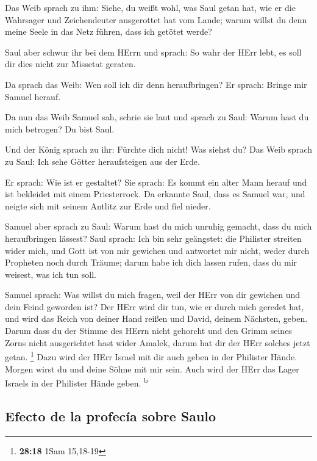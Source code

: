  Das Weib sprach zu ihm: Siehe, du weißt wohl, was Saul
getan hat, wie er die Wahrsager und Zeichendeuter ausgerottet hat vom
Lande; warum willst du denn meine Seele in das Netz führen, dass ich
getötet werde?

 Saul aber schwur ihr bei dem HErrn und sprach: So wahr
der HErr lebt, es soll dir dies nicht zur Missetat geraten.

 Da sprach das Weib: Wen soll ich dir denn heraufbringen?
Er sprach: Bringe mir Samuel herauf.

 Da nun das Weib Samuel sah, schrie sie laut und sprach
zu Saul: Warum hast du mich betrogen? Du bist Saul.

 Und der König sprach zu ihr: Fürchte dich nicht! Was
siehst du? Das Weib sprach zu Saul: Ich sehe Götter heraufsteigen aus
der Erde.

 Er sprach: Wie ist er gestaltet? Sie sprach: Es kommt
ein alter Mann herauf und ist bekleidet mit einem Priesterrock. Da
erkannte Saul, dass es Samuel war, und neigte sich mit seinem Antlitz
zur Erde und fiel nieder.

 Samuel aber sprach zu Saul: Warum hast du mich unruhig
gemacht, dass du mich heraufbringen lässest? Saul sprach: Ich bin sehr
geängstet: die Philister streiten wider mich, und Gott ist von mir
gewichen und antwortet mir nicht, weder durch Propheten noch durch
Träume; darum habe ich dich lassen rufen, dass du mir weisest, was ich
tun soll.

 Samuel sprach: Was willst du mich fragen, weil der HErr
von dir gewichen und dein Feind geworden ist?  Der HErr
wird dir tun, wie er durch mich geredet hat, und wird das Reich von
deiner Hand reißen und David, deinem Nächsten, geben. 
Darum dass du der Stimme des HErrn nicht gehorcht und den Grimm seines
Zorns nicht ausgerichtet hast wider Amalek, darum hat dir der HErr
solches jetzt getan. \footnote{\textbf{28:18} 1Sam 15,18-19}
 Dazu wird der HErr Israel mit dir auch geben in der
Philister Hände. Morgen wirst du und deine Söhne mit mir sein. Auch wird
der HErr das Lager Israels in der Philister Hände geben.
\textsuperscript{b}

\hypertarget{efecto-de-la-profecuxeda-sobre-saulo}{%
\subsection{Efecto de la profecía sobre
Saulo}\label{efecto-de-la-profecuxeda-sobre-saulo}}

